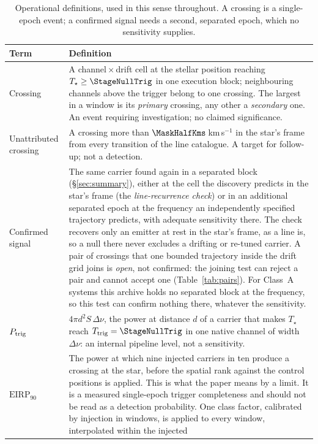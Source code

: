 \begin{table}
\centering
\caption{Operational definitions, used in this sense throughout. A crossing is
a single-epoch event; a confirmed signal needs a second, separated epoch,
which no sensitivity supplies.}
\label{tab:quantities}
\small
\begin{tabular}{@{}p{}p{}@{}}
\hline
Term & Definition \\
\hline
Crossing &
A channel\,$\times$\,drift cell at the stellar position reaching
$T_\star\geq\StageNullTrig$ in one execution block; neighbouring channels
above the trigger belong to one crossing. The largest in a window is its
\emph{primary} crossing, any other a \emph{secondary} one. An event requiring
investigation; no claimed significance. \\
Unattributed crossing &
A crossing more than $\MaskHalfKms$\,km\,s$^{-1}$ in the star's frame from
every transition of the line catalogue. A target for follow-up; not a
detection. \\
Confirmed signal &
The same carrier found again in a separated block (\S\ref{sec:summary}),
either at the cell the discovery predicts in the star's frame (the
\emph{line-recurrence check}) or in an additional separated epoch at the
frequency an independently specified trajectory predicts, with adequate
sensitivity there. The check recovers only an emitter at rest in the star's
frame, as a line is, so a null there never excludes a drifting or re-tuned
carrier. A pair of crossings that one bounded trajectory inside the drift
grid joins is \emph{open}, not confirmed: the joining test can reject a pair
and cannot accept one (Table~\ref{tab:pairs}). For \ZcNoRepSys{} Class~A
systems this archive holds no separated block at the frequency, so this test
can confirm nothing there, whatever the sensitivity. \\
$P_{\rm trig}$ &
$4\pi d^{2}S\,\Delta\nu$, the power at distance $d$ of a carrier that makes
$T_\star$ reach $T_{\rm trig}=\StageNullTrig$ in one native channel of width
$\Delta\nu$: an internal pipeline level, not a sensitivity. \\
$\mathrm{EIRP}_{90}$ &
The power at which nine injected carriers in ten produce a crossing at the
star, before the spatial rank against the control positions is applied. This
is what the paper means by a limit. It is a measured single-epoch trigger
completeness and should not be read as a detection probability. One class factor, calibrated by injection in \SensNInj{}
windows, is applied to every window, interpolated within the injected

\end{tabular}
\end{table}
